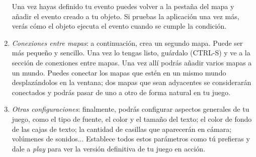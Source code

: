 \begin{enumerate}
	
	Una vez hayas definido tu evento puedes volver a la pestaña del mapa y añadir el evento creado a tu objeto. Si pruebas la aplicación una vez más, verás cómo el objeto ejecuta el evento cuando se cumple la condición.
	
	\item \textit{Conexiones entre mapas}: a continuación, crea un segundo mapa. Puede ser más pequeño y sencillo. Una vez lo tengas listo, guárdalo (CTRL-S) y ve a la sección de conexiones entre mapas. Una vez allí podrás añadir varios mapas a un mundo. Puedes conectar los mapas que estén en un mismo mundo desplazándolos en la ventana; dos mapas que sean adyacentes se considerarán conectados y podrás pasar de uno a otro de forma natural en tu juego.
	
	
	\item \textit{Otras configuraciones}: finalmente, podrás configurar aspectos generales de tu juego, como el tipo de fuente, el color y el tamaño del texto; el color de fondo de las cajas de texto; la cantidad de casillas que aparecerán en cámara; volúmenes de sonidos... Establece todos estos parámetros como tú prefieras y dale a \textit{play} para ver la versión definitiva de tu juego en acción.
	
\end{enumerate}